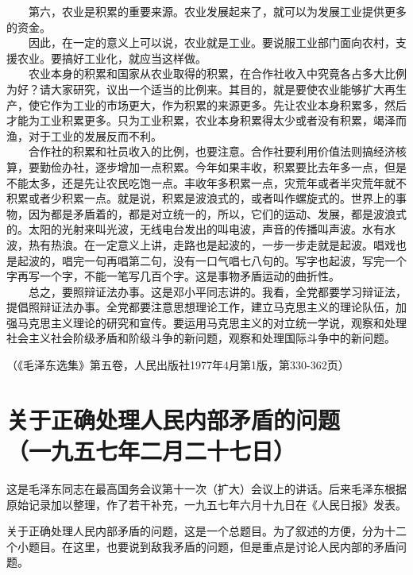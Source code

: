 \documentclass[cn,11pt,chinese]{elegantbook}
\def\myformat#1{\hfil\hfil #1}
\begin{document}
　　第六，农业是积累的重要来源。农业发展起来了，就可以为发展工业提供更多的资金。\\
　　因此，在一定的意义上可以说，农业就是工业。要说服工业部门面向农村，支援农业。要搞好工业化，就应当这样做。\\
　　农业本身的积累和国家从农业取得的积累，在合作社收入中究竟各占多大比例为好？请大家研究，议出一个适当的比例来。其目的，就是要使农业能够扩大再生产，使它作为工业的市场更大，作为积累的来源更多。先让农业本身积累多，然后才能为工业积累更多。只为工业积累，农业本身积累得太少或者没有积累，竭泽而渔，对于工业的发展反而不利。\\
　　合作社的积累和社员收入的比例，也要注意。合作社要利用价值法则搞经济核算，要勤俭办社，逐步增加一点积累。今年如果丰收，积累要比去年多一点，但是不能太多，还是先让农民吃饱一点。丰收年多积累一点，灾荒年或者半灾荒年就不积累或者少积累一点。就是说，积累是波浪式的，或者叫作螺旋式的。世界上的事物，因为都是矛盾着的，都是对立统一的，所以，它们的运动、发展，都是波浪式的。太阳的光射来叫光波，无线电台发出的叫电波，声音的传播叫声波。水有水波，热有热浪。在一定意义上讲，走路也是起波的，一步一步走就是起波。唱戏也是起波的，唱完一句再唱第二句，没有一口气唱七八句的。写字也起波，写完一个字再写一个字，不能一笔写几百个字。这是事物矛盾运动的曲折性。\\
　　总之，要照辩证法办事。这是邓小平同志讲的。我看，全党都要学习辩证法，提倡照辩证法办事。全党都要注意思想理论工作，建立马克思主义的理论队伍，加强马克思主义理论的研究和宣传。要运用马克思主义的对立统一学说，观察和处理社会主义社会阶级矛盾和阶级斗争的新问题，观察和处理国际斗争中的新问题。\\
\begin{flushright}（《毛泽东选集》第五卷，人民出版社1977年4月第1版，第330-362页）\end{flushright}
\newpage\section*{\myformat{关于正确处理人民内部矛盾的问题}\\\myformat{（一九五七年二月二十七日）}}
\begin{introduction}\item  这是毛泽东同志在最高国务会议第十一次（扩大）会议上的讲话。后来毛泽东根据原始记录加以整理，作了若干补充，一九五七年六月十九日在《人民日报》发表。\end{introduction}
关于正确处理人民内部矛盾的问题，这是一个总题目。为了叙述的方便，分为十二个小题目。在这里，也要说到敌我矛盾的问题，但是重点是讨论人民内部的矛盾问题。\\
\end{document}
